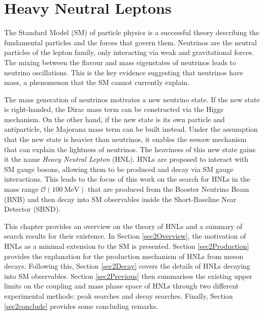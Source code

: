 
\chapter{Heavy Neutral Leptons}
\label{ChapterHNL}

\ifpdf
    \graphicspath{{Chapter2/Figs/Raster/}{Chapter2/Figs/PDF/}{Chapter2/Figs/}}
\else
    \graphicspath{{Chapter2/Figs/Vector/}{Chapter2/Figs/}}
\fi


The Standard Model (SM) of particle physics is a successful theory describing the fundamental particles and the forces that govern them.
Neutrinos are the neutral particles of the lepton family, only interacting via weak and gravitational forces.
The mixing between the flavour and mass eigenstates of neutrinos leads to neutrino oscillations.
This is the key evidence suggesting that neutrinos have mass, a phenomenon that the SM cannot currently explain.

The mass generation of neutrinos motivates a new neutrino state.
If the new state is right-handed, the Dirac mass term can be constructed via the Higgs mechanism.
On the other hand, if the new state is its own particle and antiparticle, the Majorana mass term can be built instead.
Under the assumption that the new state is heavier than neutrinos, it enables the seesaw mechanism that can explain the lightness of neutrinos.
The heaviness of this new state gains it the name \textit{Heavy Neutral Lepton} (HNL).
HNLs are proposed to interact with SM gauge bosons, allowing them to be produced and decay via SM gauge interactions.
This leads to the focus of this work on the search for HNLs in the mass range $\mathcal{O}(100~\mathrm{MeV})$ that are produced from the Booster Neutrino Beam (BNB) and then decay into SM observables inside the Short-Baseline Near Detector (SBND).

This chapter provides an overview on the theory of HNLs and a summary of search results for their existence.  
In Section \ref{sec2Overview}, the motivation of HNLs as a minimal extension to the SM is presented.
Section \ref{sec2Production} provides the explanation for the production mechanism of HNLs from meson decays.
Following this, Section \ref{sec2Decay} covers the details of HNLs decaying into SM observables. 
Section \ref{sec2Previous} then summarises the existing upper limits on the coupling and mass phase space of HNLs through two different experimental methods: peak searches and decay searches.
Finally, Section \ref{sec2conclude} provides some concluding remarks.

